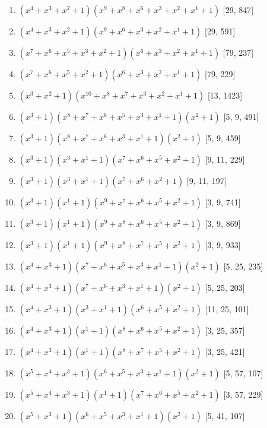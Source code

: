 \documentclass[10pt,twocolumn]{article}
\begin{document}
\begin{enumerate}
\item $(x^{4} + x^{3} + x^{2} + 1)(x^{9} + x^{8} + x^{6} + x^{3} + x^{2} + x^{1} + 1)$  [29, 847]
\item $(x^{4} + x^{3} + x^{2} + 1)(x^{9} + x^{6} + x^{3} + x^{2} + x^{1} + 1)$  [29, 591]
\item $(x^{7} + x^{6} + x^{5} + x^{3} + x^{2} + 1)(x^{6} + x^{3} + x^{2} + x^{1} + 1)$  [79, 237]
\item $(x^{7} + x^{6} + x^{5} + x^{2} + 1)(x^{6} + x^{3} + x^{2} + x^{1} + 1)$  [79, 229]
\item $(x^{3} + x^{2} + 1)(x^{10} + x^{8} + x^{7} + x^{3} + x^{2} + x^{1} + 1)$  [13, 1423]
\item $(x^{3} + 1)(x^{8} + x^{7} + x^{6} + x^{5} + x^{3} + x^{1} + 1)(x^{2} + 1)$  [5, 9, 491]
\item $(x^{3} + 1)(x^{8} + x^{7} + x^{6} + x^{3} + x^{1} + 1)(x^{2} + 1)$  [5, 9, 459]
\item $(x^{3} + 1)(x^{3} + x^{1} + 1)(x^{7} + x^{6} + x^{5} + x^{2} + 1)$  [9, 11, 229]
\item $(x^{3} + 1)(x^{3} + x^{1} + 1)(x^{7} + x^{6} + x^{2} + 1)$  [9, 11, 197]
\item $(x^{3} + 1)(x^{1} + 1)(x^{9} + x^{7} + x^{6} + x^{5} + x^{2} + 1)$  [3, 9, 741]
\item $(x^{3} + 1)(x^{1} + 1)(x^{9} + x^{8} + x^{6} + x^{5} + x^{2} + 1)$  [3, 9, 869]
\item $(x^{3} + 1)(x^{1} + 1)(x^{9} + x^{8} + x^{7} + x^{5} + x^{2} + 1)$  [3, 9, 933]
\item $(x^{4} + x^{3} + 1)(x^{7} + x^{6} + x^{5} + x^{3} + x^{1} + 1)(x^{2} + 1)$  [5, 25, 235]
\item $(x^{4} + x^{3} + 1)(x^{7} + x^{6} + x^{3} + x^{1} + 1)(x^{2} + 1)$  [5, 25, 203]
\item $(x^{4} + x^{3} + 1)(x^{3} + x^{1} + 1)(x^{6} + x^{5} + x^{2} + 1)$  [11, 25, 101]
\item $(x^{4} + x^{3} + 1)(x^{1} + 1)(x^{8} + x^{6} + x^{5} + x^{2} + 1)$  [3, 25, 357]
\item $(x^{4} + x^{3} + 1)(x^{1} + 1)(x^{8} + x^{7} + x^{5} + x^{2} + 1)$  [3, 25, 421]
\item $(x^{5} + x^{4} + x^{3} + 1)(x^{6} + x^{5} + x^{3} + x^{1} + 1)(x^{2} + 1)$  [5, 57, 107]
\item $(x^{5} + x^{4} + x^{3} + 1)(x^{1} + 1)(x^{7} + x^{6} + x^{5} + x^{2} + 1)$  [3, 57, 229]
\item $(x^{5} + x^{3} + 1)(x^{6} + x^{5} + x^{3} + x^{1} + 1)(x^{2} + 1)$  [5, 41, 107]

\end{enumerate}
\end{document}
